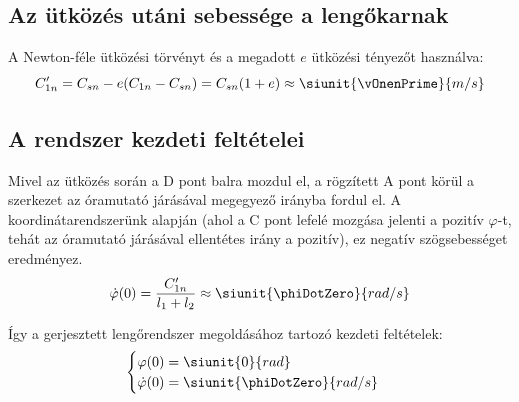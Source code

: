 \subsection{Az ütközés utáni sebessége a lengőkarnak}
A Newton-féle ütközési törvényt és a megadott $e$ ütközési tényezőt használva:
\begin{equation}
    C_{1n}' = C_{sn} - e(C_{1n} - C_{sn}) = C_{sn}(1 + e) \approx \siunit{\vOnenPrime}{m/s}
\end{equation}

\newpage
\subsection{A rendszer kezdeti feltételei}
Mivel az ütközés során a D pont balra mozdul el, a rögzített A pont körül a szerkezet az óramutató járásával megegyező irányba fordul el. A koordinátarendszerünk alapján (ahol a C pont lefelé mozgása jelenti a pozitív $\varphi$-t, tehát az óramutató járásával ellentétes irány a pozitív), ez negatív szögsebességet eredményez.
\begin{equation}
    \dot{\varphi}(0) = \frac{C_{1n}'}{l_1 + l_2} \approx \siunit{\phiDotZero}{rad/s}
\end{equation}

Így a gerjesztett lengőrendszer megoldásához tartozó kezdeti feltételek:
\begin{equation}
    \begin{cases}
        \varphi(0) = \siunit{0}{rad} \\
        \dot{\varphi}(0) = \siunit{\phiDotZero}{rad/s}
    \end{cases}
\end{equation}